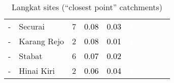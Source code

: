 \begin{table}[ht]
\begin{tabular}{C{0.05\textwidth}C{0.15\textwidth}C{0.08\textwidth}C{0.08\textwidth}C{0.08\textwidth}C{0.08\textwidth}C{0.08\textwidth}C{0.08\textwidth}C{0.08\textwidth}C{0.08\textwidth}}
  {-} & Securai &   7 & \textcolor[HTML]{000000}{0.08} & \textcolor[HTML]{000000}{0.03} & \textcolor[HTML]{FFFFFF}{4} &  &  &  &  \\ 
  {-} & Karang Rejo &   2 & \textcolor[HTML]{000000}{0.08} & \textcolor[HTML]{000000}{0.01} & \textcolor[HTML]{FFFFFF}{4} &  &  &  &  \\ 
  {-} & Stabat &   6 & \textcolor[HTML]{000000}{0.07} & \textcolor[HTML]{000000}{0.02} & \textcolor[HTML]{FFFFFF}{4} &  &  &  &  \\ 
  {-} & Hinai Kiri &   2 & \textcolor[HTML]{000000}{0.06} & \textcolor[HTML]{000000}{0.04} & \textcolor[HTML]{FFFFFF}{4} &  &  &  &  \\ 
  \end{tabular}
\endgroup
\caption{Langkat sites (``closest point'' catchments)} 
\end{table}
